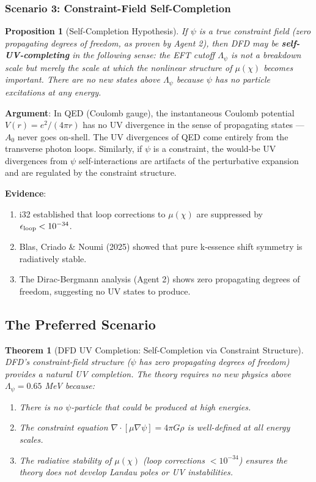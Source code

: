 \documentclass[11pt,a4paper]{article}
\newtheorem{theorem}{Theorem}
\newtheorem{proposition}{Proposition}
\begin{document}
\subsubsection{Scenario 3: Constraint-Field Self-Completion}

\begin{proposition}[Self-Completion Hypothesis]
\label{prop:self-completion}
If $\psi$ is a true constraint field (zero propagating degrees of freedom, as proven by Agent 2), then DFD may be \textbf{self-UV-completing} in the following sense: the EFT cutoff $\Lambda_\psi$ is not a breakdown scale but merely the scale at which the nonlinear structure of $\mu(\chi)$ becomes important. There are no new states above $\Lambda_\psi$ because $\psi$ has no particle excitations at any energy.
\end{proposition}

\textbf{Argument}: In QED (Coulomb gauge), the instantaneous Coulomb potential $V(r) = e^2/(4\pi r)$ has no UV divergence in the sense of propagating states --- $A_0$ never goes on-shell. The UV divergences of QED come entirely from the transverse photon loops. Similarly, if $\psi$ is a constraint, the would-be UV divergences from $\psi$ self-interactions are artifacts of the perturbative expansion and are regulated by the constraint structure.

\textbf{Evidence}:
\begin{enumerate}
\item i32 established that loop corrections to $\mu(\chi)$ are suppressed by $\epsilon_{\rm loop} < 10^{-34}$.
\item Blas, Criado \& Noumi (2025) showed that pure k-essence shift symmetry is radiatively stable.
\item The Dirac-Bergmann analysis (Agent 2) shows zero propagating degrees of freedom, suggesting no UV states to produce.
\end{enumerate}

\subsection{The Preferred Scenario}

\begin{theorem}[DFD UV Completion: Self-Completion via Constraint Structure]
\label{thm:UV-completion}
DFD's constraint-field structure ($\psi$ has zero propagating degrees of freedom) provides a natural UV completion. The theory requires no new physics above $\Lambda_\psi = 0.65$ MeV because:
\begin{enumerate}
\item There is no $\psi$-particle that could be produced at high energies.
\item The constraint equation $\nabla\cdot[\mu\nabla\psi] = 4\pi G\rho$ is well-defined at all energy scales.
\item The radiative stability of $\mu(\chi)$ (loop corrections $< 10^{-34}$) ensures the theory does not develop Landau poles or UV instabilities.
\end{enumerate}
\end{theorem}
\end{document}
